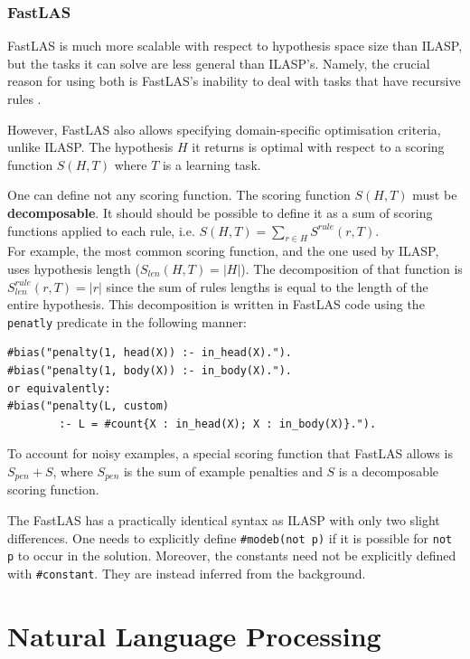 \subsubsection{FastLAS}
\label{fastlas-background}

FastLAS \cite{RefWorks:RefID:19-law2020fastlas:} is much more scalable with respect to hypothesis space size than ILASP, but the tasks it can solve are less general than ILASP's.
Namely, the crucial reason for using both is FastLAS's inability to deal with tasks that have recursive rules \cite{RefWorks:RefID:82-law2021scalable}.

However, FastLAS also allows specifying domain-specific optimisation criteria, unlike ILASP. 
The hypothesis $H$ it returns is optimal with respect to a scoring function $S(H, T)$ where $T$ is a learning task.

One can define not any scoring function.
The scoring function $S(H, T)$ must be \textbf{decomposable}.
It should should be possible to define it as a sum of scoring functions applied to each rule, i.e. $S(H, T) = \sum_{r \in H} S^{rule}(r, T)$. \\
For example, the most common scoring function, and the one used by ILASP, uses hypothesis length ($S_{len}(H, T) = |H|$).
The decomposition of that function is $S_{len}^{rule}(r, T) = |r|$ since the sum of rules lengths is equal to the length of the entire hypothesis. 
This decomposition is written in FastLAS code using the \verb_penatly_ predicate in the following manner:
\begin{verbatim}
#bias("penalty(1, head(X)) :- in_head(X).").
#bias("penalty(1, body(X)) :- in_body(X).").
or equivalently:
#bias("penalty(L, custom) 
        :- L = #count{X : in_head(X); X : in_body(X)}.").
\end{verbatim} 

To account for noisy examples, a special scoring function that FastLAS allows is $S_{pen} + S$, where $S_{pen}$ is the sum of example penalties and $S$ is a decomposable scoring function.

The FastLAS has a practically identical syntax as ILASP with only two slight differences.
One needs to explicitly define \verb+#modeb(not p)+ if it is possible for \verb+not p+ to occur in the solution.
Moreover, the constants need not be explicitly defined with \verb+#constant+. They are instead inferred from the background.


\section{Natural Language Processing}

